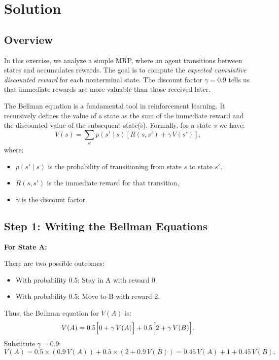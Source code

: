 \documentclass[11pt]{article}
\begin{document}
\section*{Solution}

\subsection*{Overview}

In this exercise, we analyze a simple MRP, where an agent transitions between states and accumulates rewards. The goal is to compute the \emph{expected cumulative discounted reward} for each nonterminal state. The discount factor \( \gamma = 0.9 \) tells us that immediate rewards are more valuable than those received later.

The Bellman equation is a fundamental tool in reinforcement learning. It recursively defines the value of a state as the sum of the immediate reward and the discounted value of the subsequent state(s). Formally, for a state \( s \) we have:
\[
V(s) = \sum_{s'} p(s' \mid s) \left[ R(s, s') + \gamma \, V(s') \right],
\]
where:
\begin{itemize}
    \item \( p(s' \mid s) \) is the probability of transitioning from state \( s \) to state \( s' \),
    \item \( R(s, s') \) is the immediate reward for that transition,
    \item \( \gamma \) is the discount factor.
\end{itemize}

\subsection*{Step 1: Writing the Bellman Equations}

\textbf{For State A:}

There are two possible outcomes:
\begin{itemize}
    \item With probability 0.5: Stay in A with reward 0.
    \item With probability 0.5: Move to B with reward 2.
\end{itemize}
Thus, the Bellman equation for \( V(A) \) is:
\[
V(A) = 0.5\Bigl[ 0 + \gamma\, V(A) \Bigr] + 0.5\Bigl[ 2 + \gamma\, V(B) \Bigr].
\]
Substitute \( \gamma = 0.9 \):
\[
V(A) = 0.5 \times (0.9\, V(A)) + 0.5 \times (2 + 0.9\, V(B)) = 0.45\, V(A) + 1 + 0.45\, V(B).
\]

\bigskip
\end{document}
